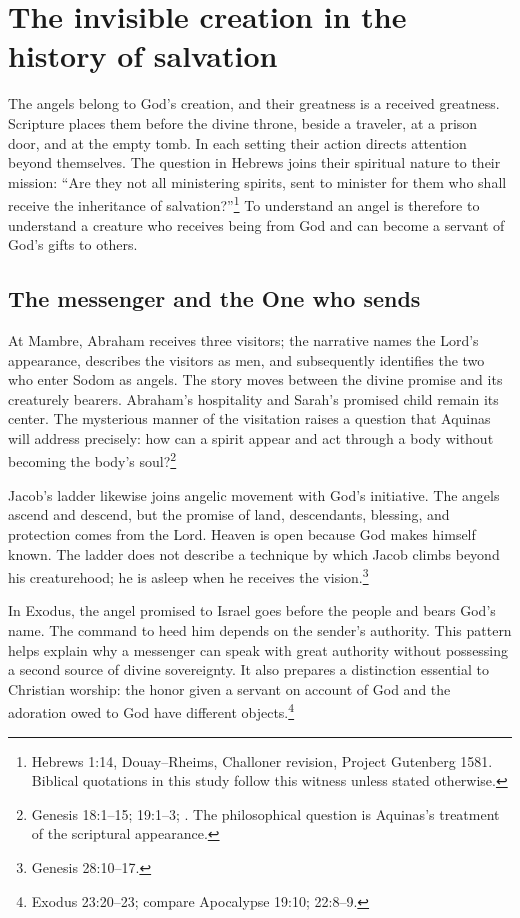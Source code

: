 \section{The invisible creation in the history of salvation}
\label{sec:scripture}

The angels belong to God's creation, and their greatness is a received
greatness. Scripture places them before the divine throne, beside a traveler,
at a prison door, and at the empty tomb. In each setting their action directs
attention beyond themselves. The question in Hebrews joins their spiritual
nature to their mission: ``Are they not all ministering spirits, sent to
minister for them who shall receive the inheritance of salvation?''\footnote{Hebrews
1:14, Douay--Rheims, Challoner revision, Project Gutenberg 1581. Biblical
quotations in this study follow this witness unless stated otherwise.}
To understand an angel is therefore to understand a creature who receives
being from God and can become a servant of God's gifts to others.

\subsection{The messenger and the One who sends}

At Mambre, Abraham receives three visitors; the narrative names the Lord's
appearance, describes the visitors as men, and subsequently identifies the
two who enter Sodom as angels. The story moves between the divine promise
and its creaturely bearers. Abraham's hospitality and Sarah's promised child
remain its center. The mysterious manner of the visitation raises a question
that Aquinas will address precisely: how can a spirit appear and act through
a body without becoming the body's soul?\footnote{Genesis 18:1--15;
19:1--3; . The philosophical question is Aquinas's
treatment of the scriptural appearance.}

Jacob's ladder likewise joins angelic movement with God's initiative.
The angels ascend and descend, but the promise of land, descendants, blessing,
and protection comes from the Lord. Heaven is open because God makes himself
known. The ladder does not describe a technique by which Jacob climbs beyond
his creaturehood; he is asleep when he receives the vision.\footnote{Genesis
28:10--17.}

In Exodus, the angel promised to Israel goes before the people and bears
God's name. The command to heed him depends on the sender's authority.
This pattern helps explain why a messenger can speak with great authority
without possessing a second source of divine sovereignty. It also prepares
a distinction essential to Christian worship: the honor given a servant on
account of God and the adoration owed to God have different objects.\footnote{Exodus
23:20--23; compare Apocalypse 19:10; 22:8--9.}


